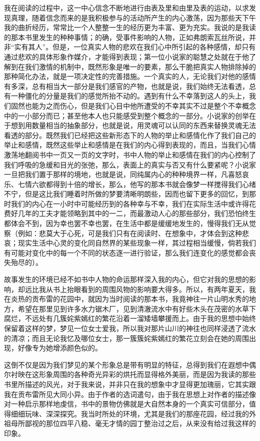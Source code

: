 \par 我在阅读的过程中，这一中心信念不断地进行由表及里和由里及表的运动，以求发现真理，随着信念而来的是我积极参与的活动所产生的内心激荡，因为那些天下午我的曲折经历，常常比一个人整整一生的经历更为丰富、更为充实。我说的是我读的那本书里发生的种种事情；的确，受事件影响的人物，正如弗朗索瓦丝所说，并非“实有其人”。但是，一位真实人物的悲欢在我们心中所引起的各种感情，却只有通过悲欢的具体形象作媒介，才能得到表现；第一位小说家的聪慧之处就在于他了解到在我们激情的机制中，既然形象是唯一的要素，那么干脆把真实人物排除掉的那种简化办法，就是一项决定性的完善措施。一个真实的人，无论我们对他的感情有多深，总有相当大一部分是我们感官的产物，也就是说，我们始终无法看透，总有一种僵化的分量是我们的感觉所抬不动的。遇到有什么不幸落到这人的头上，我们固然也能为之而伤心，但是我们心目中他所遭受的不幸其实不过是整个不幸概念中的一小部分而已；甚至他本人也只能感受到整个概念的一部分。小说家的创举在于想到用数量相当的抽象部分，也就是说，用灵魂可以认同的东西来替换灵魂无法看透的部分。既然我们已经把这些新形态下的人物的举止和感情化作了我们自己的举止和感情，既然这些举止和感情是在我们的内心得到表现的，而且，当我们心情激荡地翻阅书中一页又一页的文字时，书中人物的举止和感情在我们的内心控制了我们呼吸的急缓和目光的张弛，那么，表面上的真实与否又有什么要紧呢？小说家一旦把我们置于那样的境地，也就是说，同纯属内心的种种境界一样，凡喜怒哀乐、七情六欲都得到十倍的增长，那么，他写的那本书就会像梦一样搅得我们心绪不宁，但是这比我们睡着时所做的梦要清晰明朗些，因而也留下更多的回忆，到那时我们的内心在一小时中可能经历到的各种幸与不幸，我们在实际生活中或许得花费好几年的工夫才能领略到其中的一二，而最激动人心的那些部分，我们恐怕终生都体会不到，因为幸也罢不幸也罢，在生活中都是缓缓地发生的，慢得我们无从觉察（例如：悲莫大于心死，可是我们只有在阅读时、在想象中，才体会到这种悲哀；现实生活中心灵的变化同自然界的某些现象一样，其过程相当缓慢，倘若我们有可能对变化中的每一个不同的状态逐一进行验证，那么我们连变化的感觉都会丧失殆尽的）。
\par 故事发生的环境已经不如书中人物的命运那样深入我的内心，但它对我的思想的影响，却远比我从书上抬眼看到的周围风物的影响要大得多。所以，有两年夏天，我在炎热的贡布雷的花园中，就因为当时阅读的那本书，我竟神往一片山明水秀的地方，希望在那里见到许多水力锯木厂，见到清澈流水中有好些木头在茂密的水草下腐烂，不远处有几簇姹紫嫣红的繁花沿着一溜矮墙攀援而上。由于我的思想中始终保留着这样的梦，梦见一位女士爱我，所以我对那片山川的神往也同样浸透了流水的清凉；而且无论我忆及哪位女士，那一簇簇姹紫嫣红的繁花立刻会在她的周围出现，好像专为她增添颜色似的。
\par 这倒不仅是因为我们梦见的某个形象总是带有明显的特征，总得到我们在遐想中偶尔衬映在这形象周围的各种奇光异彩的烘托而显得格外美丽，而是因为我读的那些书里所描述的风光，对于我来说，并非只在我的想象中才显得更加瑰丽，它其实跟我在贡布雷所见大同小异。由于作者的选词遣句，由于我在思想上对作者的描述像对一种启示那样地虔信，书中的景物仿佛就是大自然本身的一个真实可信部分，值得细细玩味、深深探究。我当时所处的环境，尤其是我们的那座花园，经过我的外祖母所鄙视的那位四平八稳、毫无才情的园丁整治过之后，从来没有给过我这样的印象。
